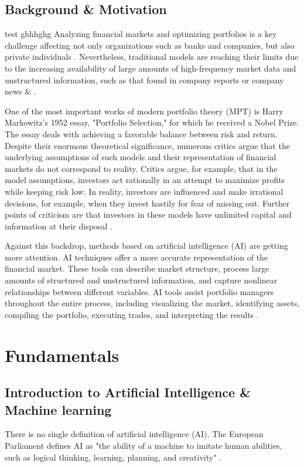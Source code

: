 \documentclass{agasthesis}
\begin{document}
\section{Background & Motivation}test
ghhhghg
Analyzing financial markets and optimizing portfolios is a key challenge affecting not only organizations such as banks and companies, 
but also private individuals \cite{salo_fifty_2024}. Nevertheless, 
traditional models are reaching their limits due to the increasing availability of large amounts of high-frequency market data and unstructured information, 
such as that found in company reports or company news \cite{zhang_novel_2023} & \cite{guo_textual_2016}.

One of the most important works of modern portfolio theory (MPT) is Harry Markowitz's 1952 essay, 
"Portfolio Selection," for which he received a Nobel Prize. The essay deals with achieving a favorable balance between risk and return. 
Despite their enormous theoretical significance, numerous critics argue that the underlying assumptions of such models and their representation of financial markets 
do not correspond to reality. Critics argue, for example, that in the model assumptions, investors act rationally in an attempt to maximize profits while keeping risk low. 
In reality, investors are influenced and make irrational decisions, for example, when they invest hastily for fear of missing out. Further points of criticism are that investors 
in these models have unlimited capital and information at their disposal \cite{mangram_simplified_2013}.

Against this backdrop, methods based on artificial intelligence (AI) are getting more attention. AI techniques offer a more accurate representation of the financial market. 
These tools can describe market structure, process large amounts of structured and unstructured information, and capture nonlinear relationships between different variables. 
AI tools assist portfolio managers throughout the entire process, 
including visualizing the market, identifying assets, compiling the portfolio, executing trades, and interpreting the results \cite{sutiene_enhancing_2024}.
\chapter{Fundamentals}
\section{Introduction to Artificial Intelligence & Machine learning}
There is no single definition of artificial intelligence (AI). The European Parliament defines AI as "the ability of a machine to imitate human abilities, 
such as logical thinking, learning, planning, and creativity" \cite[p. 98]{seidel_banking_2025}.
\end{document}
